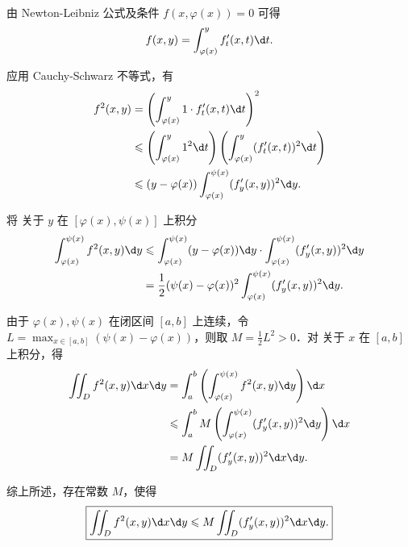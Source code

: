 \begin{myproof}
    由 Newton-Leibniz 公式及条件 $f(x, \varphi(x)) = 0$ 可得
    \begin{equation}
        f(x, y) = \int_{\varphi(x)}^y f'_t(x, t) \d t. \label{eq:Fundamental-Thm}
    \end{equation}

    应用 Cauchy-Schwarz 不等式，有
    \begin{equation}
        \begin{aligned}
            f^2(x, y) & = \left( \int_{\varphi(x)}^y 1 \cdot f'_t(x, t) \d t \right)^2                                               \\
                      & \leqslant \left( \int_{\varphi(x)}^y 1^2 \d t \right) \left( \int_{\varphi(x)}^y (f'_t(x, t))^2 \d t \right) \\
                      & \leqslant (y - \varphi(x)) \int_{\varphi(x)}^{\psi(x)} (f'_y(x, y))^2 \d y.
        \end{aligned} \label{eq:CS-Inequality}
    \end{equation}

    将  关于 $y$ 在 $[\varphi(x), \psi(x)]$ 上积分
    \begin{equation}
        \begin{aligned}
            \int_{\varphi(x)}^{\psi(x)} f^2(x, y) \d y & \leqslant \int_{\varphi(x)}^{\psi(x)} (y - \varphi(x)) \d y \cdot \int_{\varphi(x)}^{\psi(x)} (f'_y(x, y))^2 \d y \\
                                                       & = \frac{1}{2} (\psi(x) - \varphi(x))^2 \int_{\varphi(x)}^{\psi(x)} (f'_y(x, y))^2 \d y.
        \end{aligned} \label{eq:Integral-Y}
    \end{equation}

    由于 $\varphi(x), \psi(x)$ 在闭区间 $[a, b]$ 上连续，令 $L = \max_{x \in [a, b]} (\psi(x) - \varphi(x))$，则取 $M = \frac{1}{2} L^2 > 0$．对  关于 $x$ 在 $[a, b]$ 上积分，得
    \begin{equation}
        \begin{aligned}
            \iint_D f^2(x, y) \d x \d y & = \int_a^b \left( \int_{\varphi(x)}^{\psi(x)} f^2(x, y) \d y \right) \d x                \\
                                        & \leqslant \int_a^b M \left( \int_{\varphi(x)}^{\psi(x)} (f'_y(x, y))^2 \d y \right) \d x \\
                                        & = M \iint_D (f'_y(x, y))^2 \d x \d y.
        \end{aligned}
    \end{equation}

    综上所述，存在常数 $M$，使得
    \begin{equation}
        \boxed{\iint_D f^2(x, y) \d x \d y \leqslant M \iint_D (f'_y(x, y))^2 \d x \d y.}
    \end{equation}
\end{myproof}

